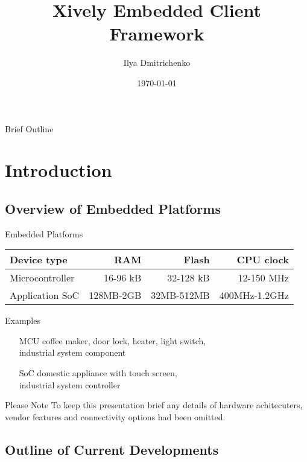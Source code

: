 \documentclass{beamer}
\title[Smart Embedded Client]{Xively Embedded Client Framework}
\author{Ilya Dmitrichenko}
\date{\today}
\begin{document}
\begin{frame}
	\titlepage
\end{frame}

\begin{frame}{Brief Outline}
	\tableofcontents
\end{frame}

\section{Introduction}
\subsection{Overview of Embedded Platforms}

\begin{frame}{Embedded Platforms}

\begin{table}\centering\begin{tabular}{l|r|r|r}
Device type & RAM & Flash & CPU clock \\\hline
Microcontroller & 16-96 kB & 32-128 kB & 12-150 MHz \\
Application SoC & 128MB-2GB & 32MB-512MB & 400MHz-1.2GHz \\
\end{tabular}\end{table}

\vskip 1cm

\begin{block}{Examples}
\begin{itemize}
  \item[MCU] coffee maker, door lock, heater, light switch,\\ industrial system component
  \item[SoC] domestic appliance with touch screen,\\ industrial system controller
\end{itemize}
\end{block}

\begin{block}{Please Note}
To keep this presentation brief any details of hardware achitecuters, vendor features and connectivity options had been omitted.
\end{block}

\end{frame}

\subsection{Outline of Current Developments}
\end{document}
